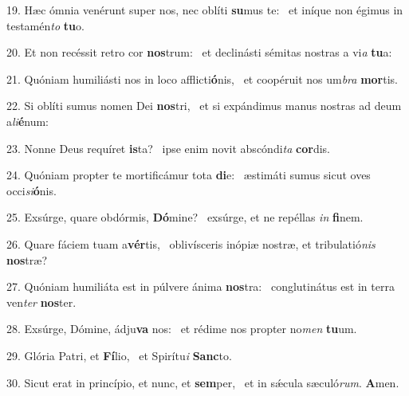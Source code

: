 19. Hæc ómnia venérunt super nos, nec oblíti \textbf{su}mus te: \ast\  et iníque non égimus in testamén\textit{to} \textbf{tu}o.\

20. Et non recéssit retro cor \textbf{nos}trum: \ast\  et declinásti sémitas nostras a vi\textit{a} \textbf{tu}a:\

21. Quóniam humiliásti nos in loco afflicti\textbf{ó}nis, \ast\  et coopéruit nos um\textit{bra} \textbf{mor}tis.\

22. Si oblíti sumus nomen Dei \textbf{nos}tri, \ast\  et si expándimus manus nostras ad deum a\textit{li}\textbf{é}num:\

23. Nonne Deus requíret \textbf{is}ta? \ast\  ipse enim novit abscóndi\textit{ta} \textbf{cor}dis.\

24. Quóniam propter te mortificámur tota \textbf{di}e: \ast\  æstimáti sumus sicut oves occi\textit{si}\textbf{ó}nis.\

25. Exsúrge, quare obdórmis, \textbf{Dó}mine? \ast\  exsúrge, et ne repéllas \textit{in} \textbf{fi}nem.\

26. Quare fáciem tuam a\textbf{vér}tis, \ast\  oblivísceris inópiæ nostræ, et tribulatió\textit{nis} \textbf{nos}træ?\

27. Quóniam humiliáta est in púlvere ánima \textbf{nos}tra: \ast\  conglutinátus est in terra ven\textit{ter} \textbf{nos}ter.\

28. Exsúrge, Dómine, ádju\textbf{va} nos: \ast\  et rédime nos propter no\textit{men} \textbf{tu}um.\

29. Glória Patri, et \textbf{Fí}lio, \ast\  et Spirítu\textit{i} \textbf{Sanc}to.\

30. Sicut erat in princípio, et nunc, et \textbf{sem}per, \ast\  et in sǽcula sæculó\textit{rum}. \textbf{A}men.\

